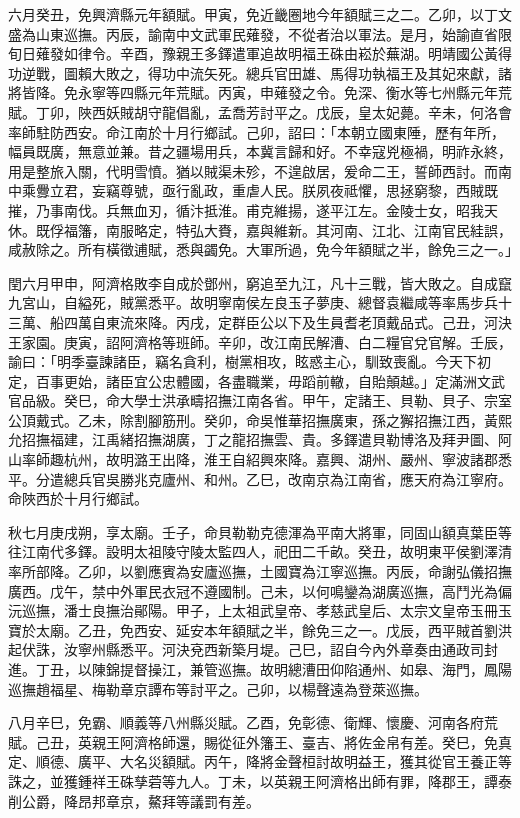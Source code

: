 \begin{pinyinscope}
六月癸丑，免興濟縣元年額賦。甲寅，免近畿圈地今年額賦三之二。乙卯，以丁文盛為山東巡撫。丙辰，諭南中文武軍民薙發，不從者治以軍法。是月，始諭直省限旬日薙發如律令。辛酉，豫親王多鐸遣軍追故明福王硃由崧於蕪湖。明靖國公黃得功逆戰，圖賴大敗之，得功中流矢死。總兵官田雄、馬得功執福王及其妃來獻，諸將皆降。免永寧等四縣元年荒賦。丙寅，申薙發之令。免深、衡水等七州縣元年荒賦。丁卯，陜西妖賊胡守龍倡亂，孟喬芳討平之。戊辰，皇太妃薨。辛未，何洛會率師駐防西安。命江南於十月行鄉試。己卯，詔曰：「本朝立國東陲，歷有年所，幅員既廣，無意並兼。昔之疆場用兵，本冀言歸和好。不幸寇兇極禍，明祚永終，用是整旅入關，代明雪憤。猶以賊渠未殄，不遑啟居，爰命二王，誓師西討。而南中乘釁立君，妄竊尊號，亟行亂政，重虐人民。朕夙夜祗懼，思拯窮黎，西賊既摧，乃事南伐。兵無血刃，循汴抵淮。甫克維揚，遂平江左。金陵士女，昭我天休。既俘福籓，南服略定，特弘大賚，嘉與維新。其河南、江北、江南官民絓誤，咸赦除之。所有橫徵逋賦，悉與蠲免。大軍所過，免今年額賦之半，餘免三之一。」

閏六月甲申，阿濟格敗李自成於鄧州，窮追至九江，凡十三戰，皆大敗之。自成竄九宮山，自縊死，賊黨悉平。故明寧南侯左良玉子夢庚、總督袁繼咸等率馬步兵十三萬、船四萬自東流來降。丙戌，定群臣公以下及生員耆老頂戴品式。己丑，河決王家園。庚寅，詔阿濟格等班師。辛卯，改江南民解漕、白二糧官兌官解。壬辰，諭曰：「明季臺諫諸臣，竊名貪利，樹黨相攻，眩惑主心，馴致喪亂。今天下初定，百事更始，諸臣宜公忠體國，各盡職業，毋蹈前轍，自貽顛越。」定滿洲文武官品級。癸巳，命大學士洪承疇招撫江南各省。甲午，定諸王、貝勒、貝子、宗室公頂戴式。乙未，除割腳筋刑。癸卯，命吳惟華招撫廣東，孫之獬招撫江西，黃熙允招撫福建，江禹緒招撫湖廣，丁之龍招撫雲、貴。多鐸遣貝勒博洛及拜尹圖、阿山率師趣杭州，故明潞王出降，淮王自紹興來降。嘉興、湖州、嚴州、寧波諸郡悉平。分遣總兵官吳勝兆克廬州、和州。乙巳，改南京為江南省，應天府為江寧府。命陜西於十月行鄉試。

秋七月庚戌朔，享太廟。壬子，命貝勒勒克德渾為平南大將軍，同固山額真葉臣等往江南代多鐸。設明太祖陵守陵太監四人，祀田二千畝。癸丑，故明東平侯劉澤清率所部降。乙卯，以劉應賓為安廬巡撫，土國寶為江寧巡撫。丙辰，命謝弘儀招撫廣西。戊午，禁中外軍民衣冠不遵國制。己未，以何鳴鑾為湖廣巡撫，高鬥光為偏沅巡撫，潘士良撫治鄖陽。甲子，上太祖武皇帝、孝慈武皇后、太宗文皇帝玉冊玉寶於太廟。乙丑，免西安、延安本年額賦之半，餘免三之一。戊辰，西平賊首劉洪起伏誅，汝寧州縣悉平。河決兗西新築月堤。己巳，詔自今內外章奏由通政司封進。丁丑，以陳錦提督操江，兼管巡撫。故明總漕田仰陷通州、如皋、海門，鳳陽巡撫趙福星、梅勒章京譚布等討平之。己卯，以楊聲遠為登萊巡撫。

八月辛巳，免霸、順義等八州縣災賦。乙酉，免彰德、衛輝、懷慶、河南各府荒賦。己丑，英親王阿濟格師還，賜從征外籓王、臺吉、將佐金帛有差。癸巳，免真定、順德、廣平、大名災額賦。丙午，降將金聲桓討故明益王，獲其從官王養正等誅之，並獲鍾祥王硃孳菪等九人。丁未，以英親王阿濟格出師有罪，降郡王，譚泰削公爵，降昂邦章京，鰲拜等議罰有差。


\end{pinyinscope}
